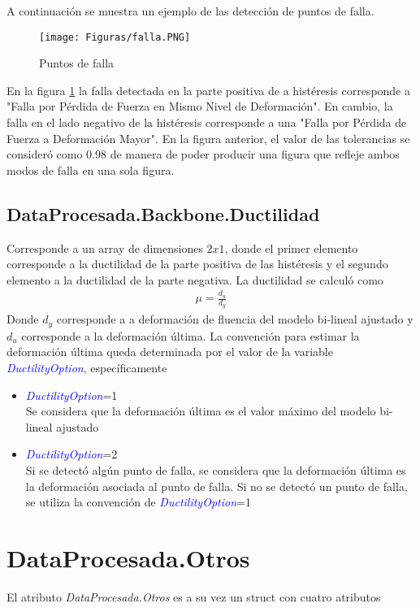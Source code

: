 \documentclass[a4paper, 11pt,article,oneside]{memoir}%
\begin{document}
A continuación se muestra un ejemplo de las detección de  puntos de falla.
   \begin{figure} [H]
    \centering
    \texttt{[image: Figuras/falla.PNG]}
    \caption{\label{Bi-Lineal 2}Puntos de falla}
    \end{figure}
En la figura \ref{Bi-Lineal 2} la falla detectada en la parte positiva de a histéresis corresponde a "Falla por Pérdida de Fuerza en Mismo Nivel de Deformación". En cambio, la falla en el lado negativo de la histéresis corresponde a una "Falla por Pérdida de Fuerza a Deformación Mayor". En la figura anterior, el valor de las tolerancias se consideró como 0.98 de manera de poder producir una figura que refleje ambos modos de falla en una sola figura.

\section{DataProcesada.Backbone.Ductilidad}
Corresponde a un array de dimensiones $2x1$, donde el primer elemento corresponde a la ductilidad de la parte positiva de las histéresis y el segundo elemento a la ductilidad de la parte negativa. La ductilidad se calculó como 
\begin{align*}
    \mu=\frac{d_u}{d_y}
\end{align*}
Donde $d_y$ corresponde a a deformación de fluencia del modelo bi-lineal ajustado y  $d_u$ corresponde a la deformación última. 
La convención para estimar la deformación última queda determinada por el valor de la variable \textit{\textcolor{blue}{DuctilityOption}}, específicamente 
\begin{itemize}
    \item \textit{\textcolor{blue}{DuctilityOption}}=1\\
    Se considera que la deformación última es el valor máximo del modelo bi-lineal ajustado
    \item \textit{\textcolor{blue}{DuctilityOption}}=2\\
    Si se detectó algún punto de falla, se considera que la deformación última es la deformación asociada al punto de falla. Si no se detectó un punto de falla, se utiliza la convención de \textit{\textcolor{blue}{DuctilityOption}}=1
\end{itemize}
\newpage
\chapter{DataProcesada.Otros}
El atributo \textit{DataProcesada.Otros} es a su vez un  struct con cuatro atributos 
\end{document}
